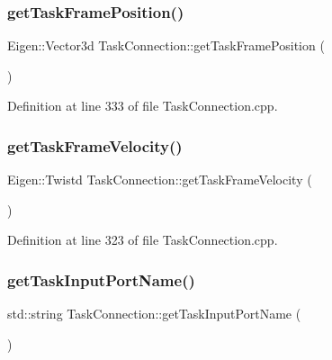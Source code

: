 \subsubsection{\texorpdfstring{get\+Task\+Frame\+Position()}{getTaskFramePosition()}}
{\footnotesize\ttfamily Eigen\+::\+Vector3d Task\+Connection\+::get\+Task\+Frame\+Position (\begin{DoxyParamCaption}{ }\end{DoxyParamCaption})}



Definition at line 333 of file Task\+Connection.\+cpp.

\hypertarget{classocra__recipes_1_1TaskConnection_a3ae346f85c5b8655698630b3f3474886}{}\label{classocra__recipes_1_1TaskConnection_a3ae346f85c5b8655698630b3f3474886} 
\subsubsection{\texorpdfstring{get\+Task\+Frame\+Velocity()}{getTaskFrameVelocity()}}
{\footnotesize\ttfamily Eigen\+::\+Twistd Task\+Connection\+::get\+Task\+Frame\+Velocity (\begin{DoxyParamCaption}{ }\end{DoxyParamCaption})}



Definition at line 323 of file Task\+Connection.\+cpp.

\hypertarget{classocra__recipes_1_1TaskConnection_ac6368ebb5b32d5319cec98fcf09d38fd}{}\label{classocra__recipes_1_1TaskConnection_ac6368ebb5b32d5319cec98fcf09d38fd} 
\subsubsection{\texorpdfstring{get\+Task\+Input\+Port\+Name()}{getTaskInputPortName()}}
{\footnotesize\ttfamily std\+::string Task\+Connection\+::get\+Task\+Input\+Port\+Name (\begin{DoxyParamCaption}{ }\end{DoxyParamCaption})}



